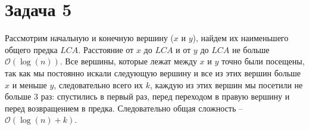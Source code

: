 \documentclass{article}
\begin{document}
	\section*{Задача 5}
	Рассмотрим начальную и конечную вершину ($x$ и $y$), найдем их наименьшего общего предка $LCA$. Расстояние от $x$ до $LCA$ и от $y$ до $LCA$ не больше $\mathcal{O}(\log(n))$. Все вершины, которые лежат между $x$ и $y$ точно были посещены, так как мы постоянно искали следующую вершину и все из этих вершин больше $x$ и меньше $y$, следовательно всего их $k$, каждую из этих вершин мы посетили не больше $3$ раз: спустились в первый раз, перед переходом в правую вершину и перед возвращением в предка. Следовательно общая сложность -- $\mathcal{O}(\log(n) + k)$.
	
\end{document}

